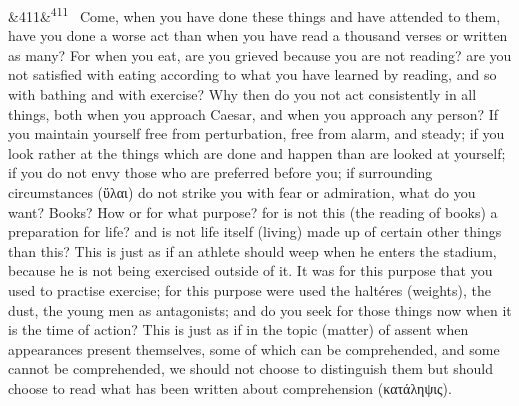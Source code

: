 \documentclass[12pt]{article}
\newcommand{\para}[1][]{\par\noindent\ifx&#1&\else\textsuperscript{\footnotesize #1}~\fi}
\begin{document}
\para[411] Come, when you have done these things and have attended to them, have you done a worse act than when you have read a thousand verses or written as many? For when you eat, are you grieved because you are not reading? are you not satisfied with eating according to what you have learned by reading, and so with bathing and with exercise? Why then do you not act consistently in all things, both when you approach Caesar, and when you approach any person? If you maintain yourself free from perturbation, free from alarm, and steady; if you look rather at the things which are done and happen than are looked at yourself; if you do not envy those who are preferred before you; if surrounding circumstances (ὕλαι) do not strike you with fear or admiration, what do you want? Books? How or for what purpose? for is not this (the reading of books) a preparation for life? and is not life itself (living) made up of certain other things than this? This is just as if an athlete should weep when he enters the stadium, because he is not being exercised outside of it. It was for this purpose that you used to practise exercise; for this purpose were used the haltéres (weights), the dust, the young men as antagonists; and do you seek for those things now when it is the time of action? This is just as if in the topic (matter) of assent when appearances present themselves, some of which can be comprehended, and some cannot be comprehended, we should not choose to distinguish them but should choose to read what has been written about comprehension (κατάληψις).
\end{document}
